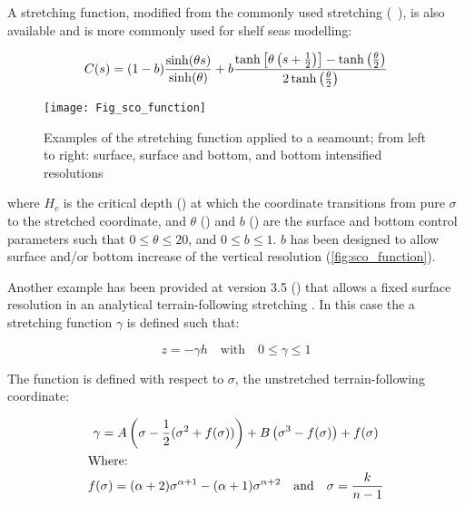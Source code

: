 \documentclass[../main/NEMO_manual]{subfiles}
\begin{document}
A stretching function,
modified from the commonly used \citet{Song_Haidvogel_JCP94} stretching (~),
is also available and is more commonly used for shelf seas modelling:

\[
  C(s) =   (1 - b) \frac{\sinh(\theta s)}{\sinh(\theta)}
         + b       \frac{\tanh \left[ \theta \left(s + \frac{1}{2} \right) \right] -   \tanh \left( \frac{\theta}{2} \right)}
                        {                                                  2 \tanh \left( \frac{\theta}{2} \right)}
\]

\begin{figure}[!ht]
  \begin{center}
    \texttt{[image: Fig\_sco\_function]}
    \caption{
      \protect\label{fig:sco_function}
      Examples of the stretching function applied to a seamount;
      from left to right: surface, surface and bottom, and bottom intensified resolutions
    }
  \end{center}
\end{figure}

where $H_c$ is the critical depth () at which the coordinate transitions from pure $\sigma$ to
the stretched coordinate, and $\theta$ () and $b$ () are the surface and
bottom control parameters such that $0 \leqslant \theta \leqslant 20$, and $0 \leqslant b \leqslant 1$.
$b$ has been designed to allow surface and/or bottom increase of the vertical resolution
(\autoref{fig:sco_function}).

Another example has been provided at version 3.5 () that allows a fixed surface resolution in
an analytical terrain-following stretching \citet{Siddorn_Furner_OM12}.
In this case the a stretching function $\gamma$ is defined such that:

\begin{equation}
  z = - \gamma h \quad \text{with} \quad 0 \leq \gamma \leq 1
\end{equation}

The function is defined with respect to $\sigma$, the unstretched terrain-following coordinate:

\begin{gather*}
  \gamma =   A \left( \sigma   - \frac{1}{2} (\sigma^2     + f (\sigma)) \right)
           + B \left( \sigma^3 - f           (\sigma) \right) + f (\sigma)       \\
  \intertext{Where:}
  f(\sigma) = (\alpha + 2) \sigma^{\alpha + 1} - (\alpha + 1) \sigma^{\alpha + 2}
  \quad \text{and} \quad \sigma = \frac{k}{n - 1}
\end{gather*}
\end{document}
